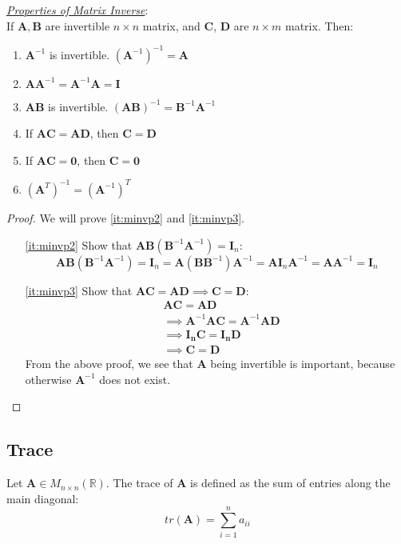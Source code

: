 \noindent\underline{\textit{Properties of Matrix Inverse}}:\\
If $\bm{A}, \bm{B}$ are invertible $n\times n$ matrix, and $\bm{C}$, $\bm{D}$ are $n\times m$ matrix. Then:
\begin{enumerate}[label=\alph*)]
    \item $\bm{A}^{-1}$ is invertible. $(\bm{A}^{-1})^{-1}=\bm{A}$
    \item $\bm{AA}^{-1}=\bm{A}^{-1}\bm{A}=\bm{I}$
    \item \label{it:minvp2} $\bm{AB}$ is invertible. $(\bm{AB})^{-1}=\bm{B}^{-1}\bm{A}^{-1}$
    \item \label{it:minvp3} If $\bm{AC}=\bm{AD}$, then $\bm{C}=\bm{D}$
    \item \label{it:minvp4} If $\bm{AC}=\bm{0}$, then $\bm{C}=\bm{0}$
    \item \label{it:minvp5} $(\bm{A}^T)^{-1}=(\bm{A}^{-1})^T$
\end{enumerate}
\begin{proof}
We will prove \ref{it:minvp2} and \ref{it:minvp3}.
\begin{enumerate}
    \item[\ref{it:minvp2}] Show that $\bm{AB}(\bm{B}^{-1}\bm{A}^{-1})=\bm{I}_n$:
    \begin{equation}
        \bm{AB}(\bm{B}^{-1}\bm{A}^{-1})=\bm{I}_n=\bm{A}(\bm{B}\bm{B}^{-1})\bm{A}^{-1}=\bm{AI}_n\bm{A}^{-1}=\bm{AA}^{-1}=\bm{I}_n
    \end{equation}
    \item[\ref{it:minvp3}] Show that $\bm{AC}=\bm{AD}\implies\bm{C}=\bm{D}$:
    \begin{align}
        &\bm{AC}=\bm{AD}\\
        &\implies \bm{A}^{-1}\bm{AC}=\bm{A}^{-1}\bm{AD}\\
        &\implies \bm{I_nC}=\bm{I_nD}\\
        &\implies \bm{C}=\bm{D}
    \end{align}
    From the above proof, we see that $\bm{A}$ being invertible is important, because otherwise $\bm{A}^{-1}$ does not exist.
\end{enumerate}
\end{proof}

\subsection{Trace}
\begin{definition}[Trace]
Let $\bm{A}\in M_{n\times n}(\mathbb{R})$. The trace of $\bm{A}$ is defined as the sum of entries along the main diagonal:
\begin{equation}
    tr(\bm{A}) = \sum_{i=1}^n a_{ii}
\end{equation}
\end{definition}

